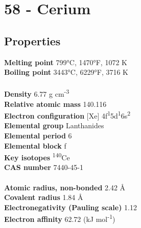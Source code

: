 \section{58 - Cerium}
\label{sec:elem-cerium}
\subsection{Properties}
\textbf{Melting point} 799°C, 1470°F, 1072 K\\
\textbf{Boiling point} 3443°C, 6229°F, 3716 K\\
\\
\textbf{Density} 6.77 g cm\textsuperscript{-3}\\
\textbf{Relative atomic mass} 140.116\\
\textbf{Electron configuration} [Xe] 4f\textsuperscript{1}5d\textsuperscript{1}6s\textsuperscript{2} \\
\textbf{Elemental group} Lanthanides\\
\textbf{Elemental period} 6\\
\textbf{Elemental block} f\\
\textbf{Key isotopes} \textsuperscript{140}Ce\\
\textbf{CAS number} 7440-45-1\\
\\
\textbf{Atomic radius, non-bonded} 2.42 Å\\
\textbf{Covalent radius} 1.84 Å\\
\textbf{Electronegativity (Pauling scale)} 1.12\\
\textbf{Electron affinity} 62.72 (kJ mol\textsuperscript{-1})\\